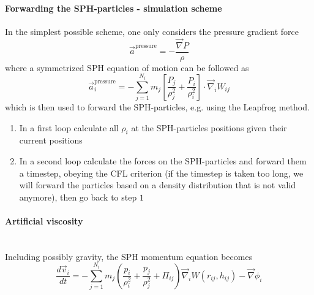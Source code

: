 \paragraph*{Forwarding the SPH-particles - simulation scheme} In the simplest
possible scheme, one only considers the pressure gradient force
\begin{equation}
    \vec{a}^{\text{pressure}} = -\frac{\vec{\nabla}P}{\rho}
\end{equation}
where a symmetrized SPH equation of motion can be followed as
\begin{equation}
    \vec{a}_i^{\text{pressure}} = -\sum_{j=1}^{N_i} m_j\left[\frac{P_j}{\rho_j^2}+\frac{P_i}{\rho_i^2}\right] \cdot \vec{\nabla}_i W_{i j}
\end{equation}
which is then used to forward the SPH-particles, e.g. using the Leapfrog method.
\begin{enumerate}
    \item In a first loop calculate all $\rho_i$ at the SPH-particles positions given their current positions
    \item In a second loop calculate the forces on the SPH-particles and forward them a timestep,
    obeying the CFL criterion (if the timestep is taken too long, we will forward
    the particles based on a density distribution that is not valid anymore), then go back to step $1$
\end{enumerate}

\paragraph*{Artificial viscosity}\mbox{}\\
Including possibly gravity, the SPH momentum equation becomes
\begin{equation}
    \frac{d \vec{v}_i}{d t}=-\sum_{j=1}^{N_i} m_j\left(\frac{p_i}{\rho_i^2}+\frac{p_j}{\rho_j^2}+\Pi_{i j}\right) \vec{\nabla}_i W\left(r_{i j}, h_{i j}\right)-\vec{\nabla} \phi_i
\end{equation}

